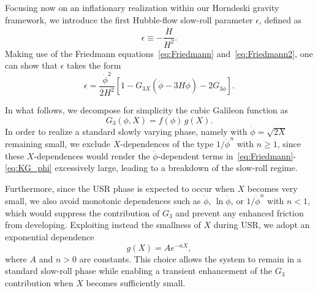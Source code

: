\documentclass[nofootinbib,aps,a4paper,letterpaper,superscriptaddress,
twocolumn,times]{revtex4}
\renewcommand{\(}{\left(}
\renewcommand{\)}{\right)}
\renewcommand{\(}{\left(}
\renewcommand{\)}{\right)}
\renewcommand{\[}{\left[}
\renewcommand{\]}{\right]}
\begin{document}
Focusing now on an inflationary realization within our Horndeski gravity 
framework, we introduce the first Hubble-flow slow-roll parameter $\epsilon$, 
defined as
\begin{equation}
\epsilon \equiv -\frac{\dot{H}}{H^2}.
\end{equation}
Making use of the Friedmann equations~\eqref{eq:Friedmann} and~\eqref{eq:Friedmann2}, one can show that 
$\epsilon$ takes the form
\begin{equation}
\epsilon = \frac{\dot{\phi}^2}{2H^2}
\left[ 1 - G_{3X}(\ddot{\phi} - 3H\dot{\phi}) - 2G_{3\phi} \right].
\end{equation}

In what follows, we decompose for simplicity the cubic Galileon function as
\begin{equation}
G_3(\phi,X) = f(\phi)\, g(X).
\end{equation}
In order to realize a standard slowly varying phase, namely 
with $\dot{\phi}=\sqrt{2X}$ remaining small, we exclude $X$-dependences of the 
type $1/\dot{\phi}^n$ with $n \geq 1$, since these $X$-dependences would render the 
$\dot{\phi}$-dependent terms in~\eqref{eq:Friedmann}-\eqref{eq:KG_phi} 
excessively large, leading to a breakdown of the slow-roll regime. 

Furthermore, since the USR phase is expected to occur when 
$X$ becomes very small, we also avoid monotonic dependences such as 
$\dot{\phi}$, $\ln\dot{\phi}$, or $1/\dot{\phi}^n$ with $n<1$, which would 
suppress the contribution of $G_3$ and prevent any enhanced friction from 
developing. Exploiting instead the smallness of $X$ during USR, we adopt an 
exponential dependence
\begin{equation}
g(X) = A e^{-nX},
\end{equation}
where $A$ and $n>0$ are constants. This choice allows the system to remain in a 
standard slow-roll phase while enabling a transient enhancement of the $G_3$ 
contribution when $X$ becomes sufficiently small.
\end{document}
